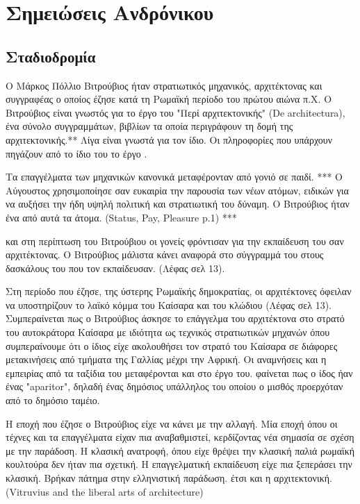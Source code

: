 
\section{Σημειώσεις Ανδρόνικου}

\subsection{Σταδιοδρομία}

Ο Μάρκος Πόλλιο Βιτρούβιος ήταν στρατιωτικός μηχανικός, αρχιτέκτονας και 
συγγραφέας ο οποίος έζησε κατά τη Ρωμαϊκή περίοδο του πρώτου αιώνα π.Χ. Ο 
Βιτρούβιος είναι γνωστός για το έργο του "Περί αρχιτεκτονικής" (De 
architectura), ένα σύνολο συγγραμμάτων, βιβλίων τα οποία περιγράφουν τη δομή 
της αρχιτεκτονικής.** Λίγα είναι γνωστά για τον ίδιο. Οι πληροφορίες που 
υπάρχουν πηγάζουν από το ίδιο του το έργο \cite[σ.~390]{masterson_status_2004}.

Τα επαγγέλματα των μηχανικών κανονικά μεταφέρονταν από γονιό σε παιδί.  *** 
Ο Αύγουστος χρησιμοποίησε σαν ευκαιρία την παρουσία των νέων ατόμων, ειδικών 
για να αυξήσει την ήδη υψηλή πολιτική και στρατιωτική του δύναμη. Ο Βιτρούβιος 
ήταν ένα από αυτά τα άτομα. (Status, Pay, Pleasure p.1) ***

και στη περίπτωση του Βιτρούβιου οι γονείς φρόντισαν για την εκπαίδευση του σαν 
αρχιτέκτονας. Ο Βιτρούβιος μάλιστα κάνει αναφορά στο σύγγραμμά του στους 
δασκάλους του που τον εκπαίδευσαν. (Λέφας σελ 13).

Στη περίοδο που έζησε, της ύστερης Ρωμαϊκής δημοκρατίας, οι αρχιτέκτονες 
όφειλαν να υποστηρίζουν το λαϊκό κόμμα του Καίσαρα και του κλώδιου (Λέφας σελ 
13). Συμπεραίνεται πως ο Βιτρούβιος άσκησε το επάγγελμα του αρχιτέκτονα στο 
στρατό του αυτοκράτορα Καίσαρα με ιδιότητα ως τεχνικός στρατιωτικών μηχανών 
όπου συμπεραίνουμε ότι ο ίδιος είχε ακολουθήσει τον στρατό του Καίσαρα σε 
διάφορες μετακινήσεις από τμήματα της Γαλλίας μέχρι την Αφρική. Οι αναμνήσεις 
και η εμπειρίας από τα ταξίδια του μεταφέρονται και στο έργο του. φαίνεται πως 
ο ίδος ήαν ένας "aparitor", δηλαδή ένας δημόσιος υπάλληλος του οποίου ο μισθός 
προερχόταν από το δημόσιο ταμέιο.

Η εποχή που έζησε ο Βιτρούβιος είχε να κάνει με την αλλαγή. Μία εποχή όπου οι 
τέχνες και τα επαγγέλματα είχαν πια αναβαθμιστεί, κερδίζοντας νέα σημασία σε 
σχέση με την παράδοση. Η κλασική ανατροφή, όπου είχε θρέψει την κλασική παλιά 
ρωμαϊκή κουλτούρα δεν ήταν πια σχετική. Η επαγγελματική εκπαίδευση είχε πια 
ξεπεράσει την κλασική. Βρήκαν πάτημα στην ελληνιστική παράδωση. έτσι και η 
αρχιτεκτονική. (Vitruvius and the liberal arts of architecture)

